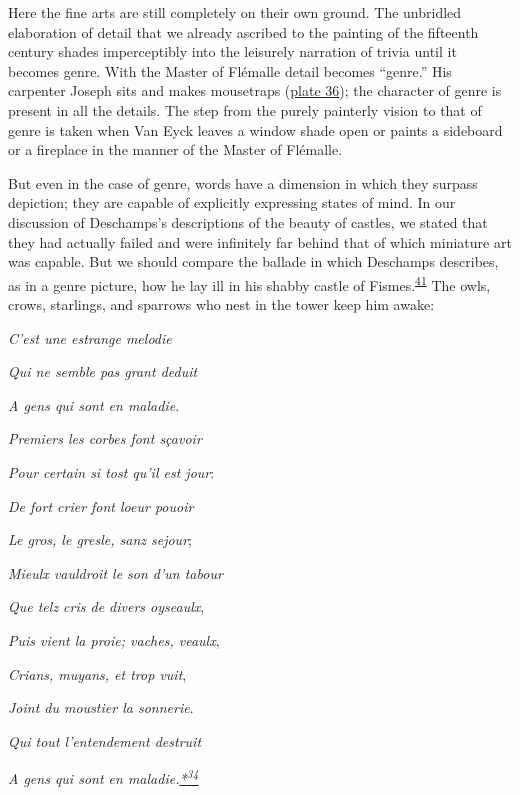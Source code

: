 Here the fine arts are still completely on their own ground. The
unbridled elaboration of detail that we already ascribed to the painting
of the fifteenth century shades imperceptibly into the leisurely
narration of trivia until it becomes genre. With the Master of Flémalle
detail becomes ``genre.'' His carpenter Joseph sits and makes
\protect\hypertarget{21_Chapter_Thirteen__IMAGE_AND_WORD.xhtmlux5cux23page_362}{}{}mousetraps
(\protect\hyperlink{20_ILLUSTRATIONS_FOLLOW_PAGE.xhtmlux5cux23id_31}{plate
36}); the character of genre is present in all the details. The step
from the purely painterly vision to that of genre is taken when Van Eyck
leaves a window shade open or paints a sideboard or a fireplace in the
manner of the Master of Flémalle.

But even in the case of genre, words have a dimension in which they
surpass depiction; they are capable of explicitly expressing states of
mind. In our discussion of Deschamps's descriptions of the beauty of
castles, we stated that they had actually failed and were infinitely far
behind that of which miniature art was capable. But we should compare
the ballade in which Deschamps describes, as in a genre picture, how he
lay ill in his shabby castle of
Fismes.\textsuperscript{\protect\hypertarget{21_Chapter_Thirteen__IMAGE_AND_WORD.xhtmlux5cux23id_229}{\protect\hyperlink{23_NOTES.xhtmlux5cux23id_230}{41}}}
The owls, crows, starlings, and sparrows who nest in the tower keep him
awake:

\emph{C'est une estrange melodie}

\emph{Qui ne semble pas grant deduit}

\emph{A gens qui sont en maladie}.

\emph{Premiers les corbes font sçavoir}

\emph{Pour certain si tost qu'il est jour}:

\emph{De fort crier font loeur pouoir}

\emph{Le gros, le gresle, sanz sejour};

\emph{Mieulx vauldroit le son d'un tabour}

\emph{Que telz cris de divers oyseaulx},

\emph{Puis vient la proie; vaches, veaulx},

\emph{Crians, muyans, et trop vuit},

\emph{Joint du moustier la sonnerie}.

\emph{Qui tout l'entendement destruit}

\emph{A gens qui sont en
maladie.\protect\hypertarget{21_Chapter_Thirteen__IMAGE_AND_WORD.xhtmlux5cux23id_2761}{\protect\hyperlink{23_NOTES.xhtmlux5cux23id_2762}{*\textsuperscript{34}}}}

